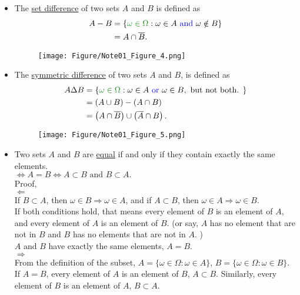 \documentclass[12pt,thmsa]{article}
\begin{document}
\begin{itemize}
	\item  The \underline{set difference} of two sets \(A\) and \(B\) is defined as
\[\begin{aligned}
A-B &=\{ {\color{forestgreen}{\omega \in \Omega}}: \omega \in A {\color{blue}{\text { and }}} \omega \notin B\}\\
&= A \cap \overline{B}.
\end{aligned}
\]
    \begin{figure}[H] %
    \centering
    \texttt{[image: Figure/Note01\_Figure\_4.png]}
    \end{figure}
    
	\item  The \underline{symmetric difference} of two sets \(A\) and \(B\), is defined as
\[\begin{aligned}
A \Delta B & =\{ {\color{forestgreen}{\omega \in \Omega}}: \omega \in A {\color{blue}{\text { or }}} \omega \in B, \text { but not both. }\} \\
& = \left( A \cup B \right) - \left( A \cap B \right) \\
& = \left( A \cap \overline{B} \right) \cup \left( \overline{A} \cap B \right).
\end{aligned}
\]
    \begin{figure}[H] %
    \centering
    \texttt{[image: Figure/Note01\_Figure\_5.png]}
    \end{figure}
    
	\item  Two sets \(A\) and \(B\) are  \underline{equal} if and only if they contain exactly the same elements. \\
	\(\Longleftrightarrow A=B \Leftrightarrow A \subset B \text{ and } B \subset A.\) \\
	Proof, \\
	\(\Longleftarrow\) \\
	If \(B \subset A\), then \(\omega \in B \Rightarrow \omega \in A \), and if \(A \subset B\), then \(\omega \in A \Rightarrow \omega \in B \). \\
	If both conditions hold, that means every element of \(B\) is an element of \(A\), and every element of \(A\) is an element of \(B\). (or say, \(A\) has no element that are not in \(B\) and \(B\) has no elements that are not in \(A\). ) \\
	\(A\) and \(B\) have exactly the same elements, \(A = B\).\\
	\(\Longrightarrow\) \\
	From the definition of the subset, 
	\(A =\{ \omega \in \Omega: \omega \in A \}\),  \(B =\{ \omega \in \Omega: \omega \in B \}\). \\
	If \(A=B\), every element of \(A\) is an element of \(B\), \(A \subset B\). Similarly, every element of \(B\) is an element of \(A\), \(B \subset A\).
\end{itemize}
\end{document}
